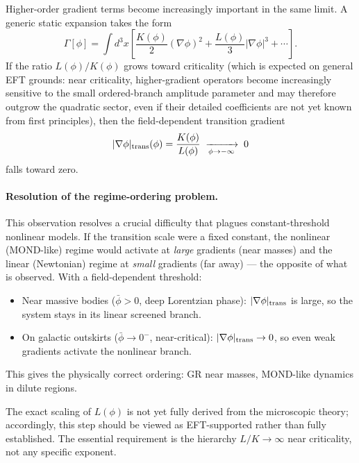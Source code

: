 \documentclass[11pt,a4paper]{article}
\numberwithin{equation}{section}
\begin{document}
Higher-order gradient terms become increasingly important in the
same limit. A generic static expansion takes the form
\begin{equation}
\Gamma[\phi]
= \int d^3x\left[
  \frac{K(\phi)}{2}(\nabla\phi)^2
  + \frac{L(\phi)}{3}|\nabla\phi|^3
  + \cdots
\right].
\label{eq:gamma_gradient_main}
\end{equation}
If the ratio $L(\phi)/K(\phi)$ grows toward criticality
(which is expected on general EFT grounds: near criticality,
higher-gradient operators become increasingly sensitive to
the small ordered-branch amplitude parameter and may therefore outgrow
the quadratic sector, even if their detailed coefficients are
not yet known from first principles), then
the field-dependent transition gradient
\begin{equation}
|\nabla\phi|_{\rm trans}(\phi)
= \frac{K(\phi)}{L(\phi)}
\;\xrightarrow[\phi\to-\infty]{}\; 0
\label{eq:transition_gradient_main}
\end{equation}
falls toward zero.

\paragraph{Resolution of the regime-ordering problem.}
This observation resolves a crucial difficulty that plagues
constant-threshold nonlinear models. If the transition scale were
a fixed constant, the nonlinear (MOND-like) regime would activate
at \emph{large} gradients (near masses) and the linear (Newtonian)
regime at \emph{small} gradients (far away) --- the opposite of
what is observed. With a field-dependent threshold:
\begin{itemize}
\item Near massive bodies ($\bar\phi > 0$, deep Lorentzian phase):
  $|\nabla\phi|_{\rm trans}$ is large, so the system stays in its
  linear screened branch.
\item On galactic outskirts ($\bar\phi \to 0^-$, near-critical):
  $|\nabla\phi|_{\rm trans} \to 0$, so even weak gradients
  activate the nonlinear branch.
\end{itemize}
This gives the physically correct ordering: GR near masses,
MOND-like dynamics in dilute regions.

The exact scaling of $L(\phi)$ is not yet fully derived from the
microscopic theory; accordingly, this step should be viewed as
EFT-supported rather than fully established. The essential
requirement is the hierarchy $L/K \to \infty$ near criticality,
not any specific exponent.
\end{document}
